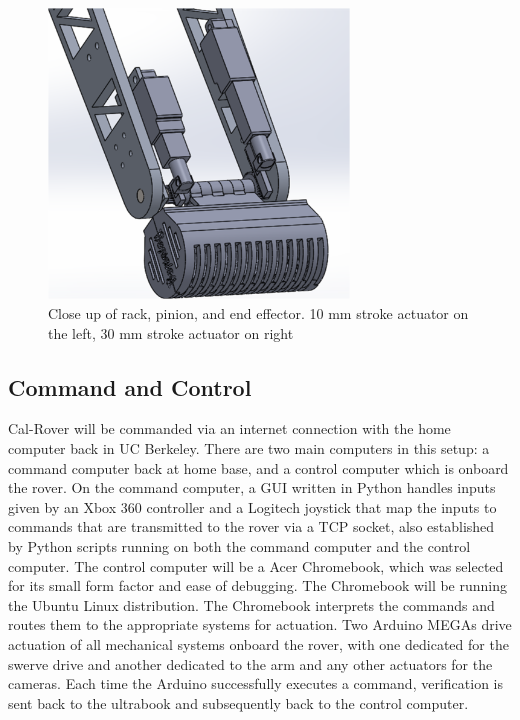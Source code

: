 \documentclass[titlepage,twocolumn,10pt]{article}
\begin{document}
    \begin{figure}[H]
        \centering
        \includegraphics*[width = 8cm]{images/endeff.png}
        \caption{Close up of rack, pinion, and end effector. 10 mm stroke actuator on the left, 30 mm stroke actuator on right}
    \end{figure}

    \subsection{Command and Control}
    Cal-Rover will be commanded via an internet connection with the home computer back in UC Berkeley. There are two main computers in this setup: a command computer back at home base, and a control computer which is onboard the rover. On the command computer, a GUI written in Python handles inputs given by an Xbox 360 controller and a Logitech joystick that map the inputs to commands that are transmitted to the rover via a TCP socket, also established by Python scripts running on both the command computer and the control computer. The control computer will be a Acer Chromebook, which was selected for its small form factor and ease of debugging. The Chromebook will be running the Ubuntu Linux distribution.  The Chromebook interprets the commands and routes them to the appropriate systems for actuation. Two Arduino MEGAs drive actuation of all mechanical systems onboard the rover, with one dedicated for the swerve drive and another dedicated to the arm and any other actuators for the cameras. Each time the Arduino successfully executes a command, verification is sent back to the ultrabook and subsequently back to the control computer.
\end{document}
